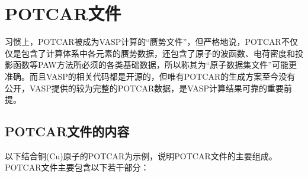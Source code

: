 \section{\rm{POTCAR}文件}
习惯上，\textrm{POTCAR}被成为\textrm{VASP}计算的``赝势文件''，但严格地说，\textrm{POTCAR}不仅仅是包含了计算体系中各元素的赝势数据，还包含了原子的波函数、电荷密度和投影函数等\textrm{PAW}方法所必须的各类基础数据，所以称其为``原子数据集文件''可能更准确。而且\textrm{VASP}的相关代码都是开源的，但唯有\textrm{POTCAR}的生成方案至今没有公开，\textrm{VASP}提供的较为完整的\textrm{POTCAR}数据，是\textrm{VASP}计算结果可靠的重要前提。
\subsection{\rm{POTCAR}文件的内容}
以下结合铜\textrm{(Cu)}原子的\textrm{POTCAR}为示例，说明\textrm{POTCAR}文件的主要组成。\textrm{POTCAR}文件主要包含以下若干部分：
